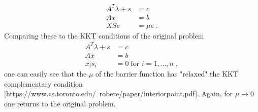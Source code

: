 \begin{subequations}
\begin{align}
	A^T \lambda + s &= c \\
	A x &= b \\
	X S e &= \mu e \; .
\end{align}
\end{subequations}
Comparing these to the KKT conditions of the original problem
\begin{subequations}
\begin{align}
	A^T \lambda + s &= c \\
	A x &= b \\
	x_i s_i &= 0 \; \text{for } i = 1, \ldots , n  \; ,
\end{align}
\end{subequations}
one can easily see that the $\mu$ of the barrier function has "relaxed" the KKT complementary condition [https://www.cs.toronto.edu/~robere/paper/interiorpoint.pdf]. Again, for $\mu \to 0$ one returns to the original problem. 


